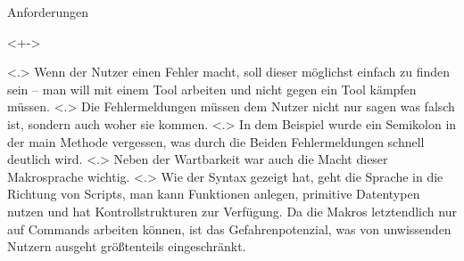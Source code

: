 \begin{frame}{Anforderungen}
\begin{itemize}
        \begin{uncoverenv}<+->%
          \begin{myInvBox}[width=.9\linewidth]
            
          \end{myInvBox}
          \vspace{-6em}
        \end{uncoverenv}
            \note[item]<.>{
              Wenn der Nutzer einen Fehler macht, soll dieser möglichst einfach zu finden sein -- man will mit einem Tool arbeiten und nicht gegen ein Tool kämpfen müssen.
            }
            \note[item]<.>{
              Die Fehlermeldungen müssen dem Nutzer nicht nur sagen was falsch ist, sondern auch woher sie kommen.
            }
            \note[item]<.>{
              In dem Beispiel wurde ein Semikolon in der main Methode vergessen, was durch die Beiden Fehlermeldungen schnell deutlich wird.
            }
        \onslide<+->
            \note[item]<.>{
              Neben der Wartbarkeit war auch die Macht dieser Makrosprache wichtig.
            }
            \note[item]<.>{
              Wie der Syntax gezeigt hat, geht die Sprache in die Richtung von Scripts, man kann Funktionen anlegen, primitive Datentypen nutzen und hat Kontrollstrukturen zur Verfügung. Da die Makros letztendlich nur auf Commands arbeiten können, ist das Gefahrenpotenzial, was von unwissenden Nutzern ausgeht größtenteils eingeschränkt.
            }
    \end{itemize}
  \end{frame}

